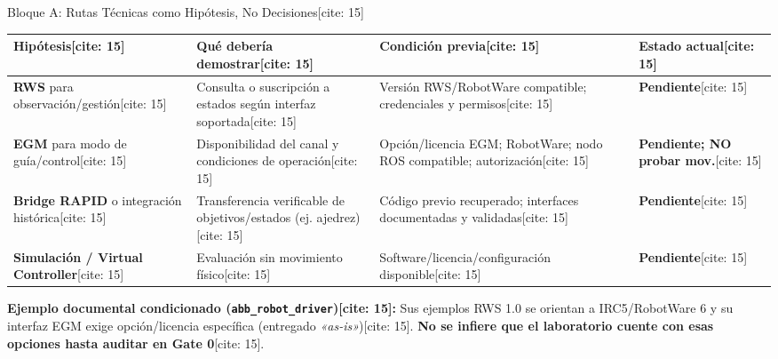\documentclass[aspectratio=169, xcolor={table,xcdraw}]{beamer}
\begin{document}
\begin{frame}{Bloque A: Rutas Técnicas como Hipótesis, No Decisiones[cite: 15]}
    \begin{center}
        \renewcommand{\arraystretch}{1.35}
        \scriptsize
        \begin{tabular}{|>{\raggedright\arraybackslash}p{2.9cm}|>{\raggedright\arraybackslash}p{3.6cm}|>{\raggedright\arraybackslash}p{4.1cm}|>{\raggedright\arraybackslash}p{2.4cm}|}
        \hline
        \rowcolor{ucbblue!20} \textbf{Hipótesis}[cite: 15] & \textbf{Qué debería demostrar}[cite: 15] & \textbf{Condición previa}[cite: 15] & \textbf{Estado actual}[cite: 15] \\ \hline
        \textbf{RWS} para observación/gestión[cite: 15] & Consulta o suscripción a estados según interfaz soportada[cite: 15] & Versión RWS/RobotWare compatible; credenciales y permisos[cite: 15] & \textbf{Pendiente}[cite: 15] \\ \hline
        \textbf{EGM} para modo de guía/control[cite: 15] & Disponibilidad del canal y condiciones de operación[cite: 15] & Opción/licencia EGM; RobotWare; nodo ROS compatible; autorización[cite: 15] & \textbf{Pendiente; NO probar mov.}[cite: 15] \\ \hline
        \textbf{Bridge RAPID} o integración histórica[cite: 15] & Transferencia verificable de objetivos/estados (ej. ajedrez)[cite: 15] & Código previo recuperado; interfaces documentadas y validadas[cite: 15] & \textbf{Pendiente}[cite: 15] \\ \hline
        \textbf{Simulación / Virtual Controller}[cite: 15] & Evaluación sin movimiento físico[cite: 15] & Software/licencia/configuración disponible[cite: 15] & \textbf{Pendiente}[cite: 15] \\ \hline
        \end{tabular}
    \end{center}

    \vspace{0.15cm}
    \scriptsize\raggedright
    \textbf{Ejemplo documental condicionado (\texttt{abb\_robot\_driver})[cite: 15]:} Sus ejemplos RWS 1.0 se orientan a IRC5/RobotWare 6 y su interfaz EGM exige opción/licencia específica (entregado \textit{«as-is»})[cite: 15]. \textbf{No se infiere que el laboratorio cuente con esas opciones hasta auditar en Gate 0}[cite: 15].
\end{frame}
\end{document}
